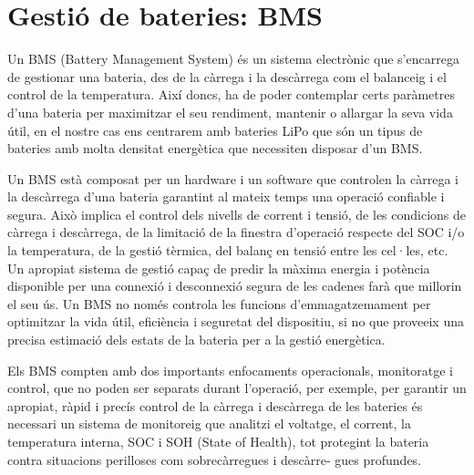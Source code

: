 \chapter{Gestió de bateries: BMS}
\label{chap:BMS}


Un BMS (Battery Management System) és un sistema electrònic que \newline s'encarrega de gestionar una bateria, des de la càrrega i la descàrrega com el balanceig i el control de la temperatura. Així doncs, ha de poder contemplar certs paràmetres d'una bateria per maximitzar el seu rendiment, mantenir o allargar la seva vida útil, en el nostre cas ens centrarem amb bateries LiPo que són un tipus de bateries amb molta densitat energètica que necessiten disposar d'un BMS.

Un BMS està composat per un hardware i un software que controlen la càrrega i la descàrrega d'una bateria garantint al mateix temps una operació confiable i segura. Això implica el control dels nivells de corrent i tensió, de les condicions de càrrega i descàrrega, de la limitació de la finestra d'operació respecte del SOC i/o la temperatura, de la gestió tèrmica, del balanç en tensió entre les cel·les, etc. Un apropiat sistema de gestió capaç de predir la màxima energia i potència disponible per una connexió i desconnexió segura de les cadenes farà que millorin el seu ús. Un BMS no només controla les funcions d'emmagatzemament per optimitzar la vida útil, eficiència i seguretat del dispositiu, si no que proveeix una precisa estimació dels estats de la bateria per a la gestió energètica. 

\newpage

Els BMS compten amb dos importants enfocaments operacionals, monitoratge i control, que no poden ser separats durant l'operació, per exemple, per garantir un apropiat, ràpid i precís control de la càrrega i descàrrega de les bateries és necessari un sistema de monitoreig que analitzi el voltatge, el corrent, la temperatura interna, SOC i SOH (State of Health), tot protegint la bateria contra situacions perilloses com sobrecàrregues i descàrre- \newline gues profundes.

